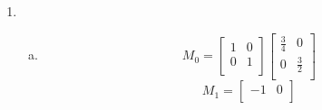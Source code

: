 \documentclass[11pt, oneside]{article}
\begin{document}
\begin{enumerate}[Problem 1:]
\begin{enumerate}[1.]
\begin{enumerate}[a)]
\[\begin{bmatrix}
                  0 & \frac 3 2\\
                  -1 & 0\\
                \end{bmatrix}
              \right)
              \Big/ 2
              =
              \begin{bmatrix}
                \frac 1 4 & \frac 3 4\\
                -\frac 1 2 & \frac 1 4\\
              \end{bmatrix}
            \]
          \item
            \[
              \left(
                \begin{bmatrix}
                  1 & 1\\
                  -1 & 1\\
                \end{bmatrix}
                +
                \begin{bmatrix}
                  0 & -1\\
                  1 & 0\\
                \end{bmatrix}
              \right)
              \Big/ 2
              =
              \begin{bmatrix}
                \frac 1 2 & 0\\
                0 & \frac 1 2\\
              \end{bmatrix}
            \]
        \end{enumerate}
      \item
        \begin{enumerate}[a)]
          \item
            \[
              M_0 = 
              \begin{bmatrix}
                1 & 0\\
                0 & 1\\
              \end{bmatrix}
              \begin{bmatrix}
                \frac 3 4 & 0\\
                0 & \frac 3 2\\
              \end{bmatrix}
            \]
            \[
              M_1 = 
              \begin{bmatrix}
                -1 & 0\\

\end{bmatrix}\]
\end{enumerate}
\end{enumerate}
\end{enumerate}
\end{document}

